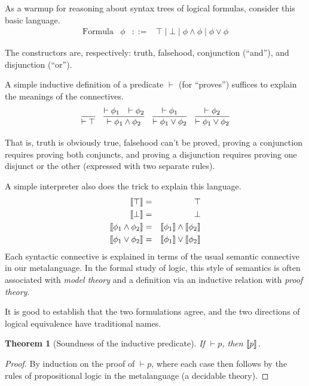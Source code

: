 \documentclass{amsbook}
\newtheorem{theorem}{Theorem}[chapter]
\theoremstyle{definition}
\theoremstyle{remark}
\numberwithin{section}{chapter}
\numberwithin{equation}{chapter}
\begin{document}
As a warmup for reasoning about syntax trees of logical formulas, consider this basic language. 
$$\begin{array}{rrcl}
  \textrm{Formula} & \phi &::=& \top \mid \bot \mid \phi \land \phi \mid \phi \lor \phi
\end{array}$$

The constructors are, respectively: truth, falsehood, conjunction (``and''), and disjunction (``or'').

A simple inductive definition of a predicate $\vdash$ (for ``proves'') suffices to explain the meanings of the connectives.
$$\infer{\vdash \top}{}
\quad \infer{\vdash \phi_1 \land \phi_2}{
  \vdash \phi_1
  & \vdash \phi_2
}
\quad \infer{\vdash \phi_1 \lor \phi_2}{
  \vdash \phi_1
}
\quad \infer{\vdash \phi_1 \lor \phi_2}{
  \vdash \phi_2
}$$

That is, truth is obviously true, falsehood can't be proved, proving a conjunction requires proving both conjuncts, and proving a disjunction requires proving one disjunct or the other (expressed with two separate rules).

A simple interpreter also does the trick to explain this language.
\begin{eqnarray*}
  {\left \llbracket \top \right \rrbracket} &=& \top \\
  {\left \llbracket \bot \right \rrbracket} &=& \bot \\
  {\left \llbracket \phi_1 \land \phi_2 \right \rrbracket} &=& {\left \llbracket \phi_1 \right \rrbracket} \land {\left \llbracket \phi_2 \right \rrbracket} \\
  {\left \llbracket \phi_1 \lor \phi_2 \right \rrbracket} &=& {\left \llbracket \phi_1 \right \rrbracket} \lor {\left \llbracket \phi_2 \right \rrbracket}
\end{eqnarray*}
Each syntactic connective is explained in terms of the usual semantic connective in our metalanguage.
In the formal study of logic, this style of semantics is often associated with \emph{model theory} and a definition via an inductive relation with \emph{proof theory}.

It is good to establish that the two formulations agree, and the two directions of logical equivalence have traditional names.

\begin{theorem}[Soundness of the inductive predicate]
  If $\vdash p$, then ${\left \llbracket p \right \rrbracket}$.
\end{theorem}
\begin{proof}
  By induction on the proof of $\vdash p$, where each case then follows by the rules of propositional logic in the metalanguage (a decidable theory).
\end{proof}
\end{document}

